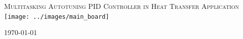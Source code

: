 \begin{titlepage}
\begin{center}

\textsc{\Huge Multitasking Autotuning PID Controller in Heat Transfer Application}\\[1.5cm]
\texttt{[image: ../images/main\_board]}~

\vfill

\today

\end{center}
\end{titlepage}
